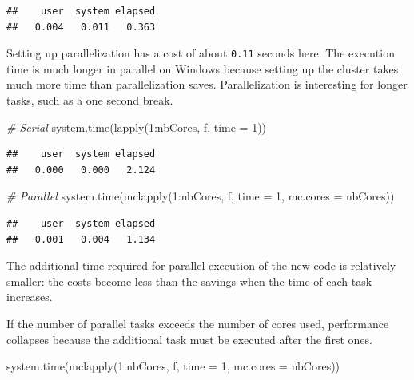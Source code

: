 \documentclass[
  12pt,
  american,
  a4paper,
  extrafontsizes,onecolumn,openright
  ]{memoir}
\newenvironment{Shaded}{\begin{snugshade}}{\end{snugshade}}
\newcommand{\AttributeTok}[1]{\textcolor[rgb]{0.77,0.63,0.00}{#1}}
\newcommand{\CommentTok}[1]{\textcolor[rgb]{0.56,0.35,0.01}{\textit{#1}}}
\newcommand{\DecValTok}[1]{\textcolor[rgb]{0.00,0.00,0.81}{#1}}
\newcommand{\FunctionTok}[1]{\textcolor[rgb]{0.00,0.00,0.00}{#1}}
\newcommand{\NormalTok}[1]{#1}
\newcommand{\SpecialCharTok}[1]{\textcolor[rgb]{0.00,0.00,0.00}{#1}}
\newlength{\rf}
\begin{document}
\begin{verbatim}
##    user  system elapsed 
##   0.004   0.011   0.363
\end{verbatim}

\normalsize

Setting up parallelization has a cost of about \texttt{0.11} seconds here.
The execution time is much longer in parallel on Windows because setting up the cluster takes much more time than parallelization saves.
Parallelization is interesting for longer tasks, such as a one second break.

\scriptsize

\begin{Shaded}
\begin{Highlighting}[]
\CommentTok{\# Serial}
\FunctionTok{system.time}\NormalTok{(}\FunctionTok{lapply}\NormalTok{(}\DecValTok{1}\SpecialCharTok{:}\NormalTok{nbCores, f, }\AttributeTok{time =} \DecValTok{1}\NormalTok{))}
\end{Highlighting}
\end{Shaded}

\begin{verbatim}
##    user  system elapsed 
##   0.000   0.000   2.124
\end{verbatim}

\begin{Shaded}
\begin{Highlighting}[]
\CommentTok{\# Parallel}
\FunctionTok{system.time}\NormalTok{(}\FunctionTok{mclapply}\NormalTok{(}\DecValTok{1}\SpecialCharTok{:}\NormalTok{nbCores, f, }\AttributeTok{time =} \DecValTok{1}\NormalTok{, }\AttributeTok{mc.cores =}\NormalTok{ nbCores))}
\end{Highlighting}
\end{Shaded}

\begin{verbatim}
##    user  system elapsed 
##   0.001   0.004   1.134
\end{verbatim}

\normalsize

The additional time required for parallel execution of the new code is relatively smaller: the costs become less than the savings when the time of each task increases.

If the number of parallel tasks exceeds the number of cores used, performance collapses because the additional task must be executed after the first ones.

\scriptsize

\begin{Shaded}
\begin{Highlighting}[]
\FunctionTok{system.time}\NormalTok{(}\FunctionTok{mclapply}\NormalTok{(}\DecValTok{1}\SpecialCharTok{:}\NormalTok{nbCores, f, }\AttributeTok{time =} \DecValTok{1}\NormalTok{, }\AttributeTok{mc.cores =}\NormalTok{ nbCores))}
\end{Highlighting}
\end{Shaded}
\end{document}
